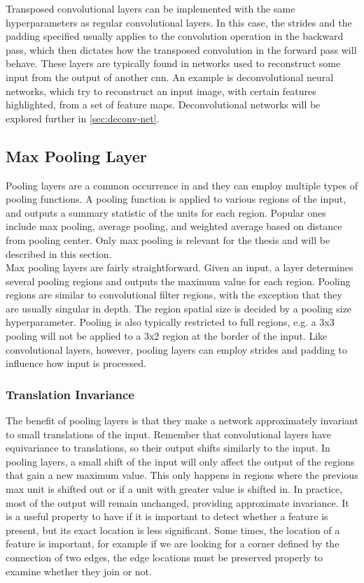 \noindent Transposed convolutional layers can be implemented with the same hyperparameters as regular convolutional layers. In this case, the strides and the padding specified usually applies to the convolution operation in the backward pass, which then dictates how the transposed convolution in the forward pass will behave. These layers are typically found in networks used to reconstruct some input from the output of another \acrshort{cnn}. An example is deconvolutional neural networks, which try to reconstruct an input image, with certain features highlighted, from a set of feature maps. Deconvolutional networks will be explored further in \autoref{sec:deconv-net}.

\subsection{Max Pooling Layer}

Pooling layers are a common occurrence in  and they can employ multiple types of pooling functions. A pooling function is applied to various regions of the input, and outputs a summary statistic of the units for each region. Popular ones include max pooling, average pooling, and weighted average based on distance from pooling center. Only max pooling is relevant for the thesis and will be described in this section. \\

\noindent Max pooling layers are fairly straightforward. Given an input, a layer determines several pooling regions and outputs the maximum value for each region. Pooling regions are similar to convolutional filter regions, with the exception that they are usually singular in depth. The region spatial size is decided by a pooling size hyperparameter. Pooling is also typically restricted to full regions, e.g. a 3x3 pooling will not be applied to a 3x2 region at the border of the input. Like convolutional layers, however, pooling layers can employ strides and padding to influence how input is processed.

\subsubsection{Translation Invariance}

The benefit of pooling layers is that they make a network approximately invariant to small translations of the input. Remember that convolutional layers have equivariance to translations, so their output shifts similarly to the input. In pooling layers, a small shift of the input will only affect the output of the regions that gain a new maximum value. This only happens in regions where the previous max unit is shifted out or if a unit with greater value is shifted in. In practice, most of the output will remain unchanged, providing approximate invariance. It is a useful property to have if it is important to detect whether a feature is present, but its exact location is less significant. Some times, the location of a feature is important, for example if we are looking for a corner defined by the connection of two edges, the edge locations must be preserved properly to examine whether they join or not.

